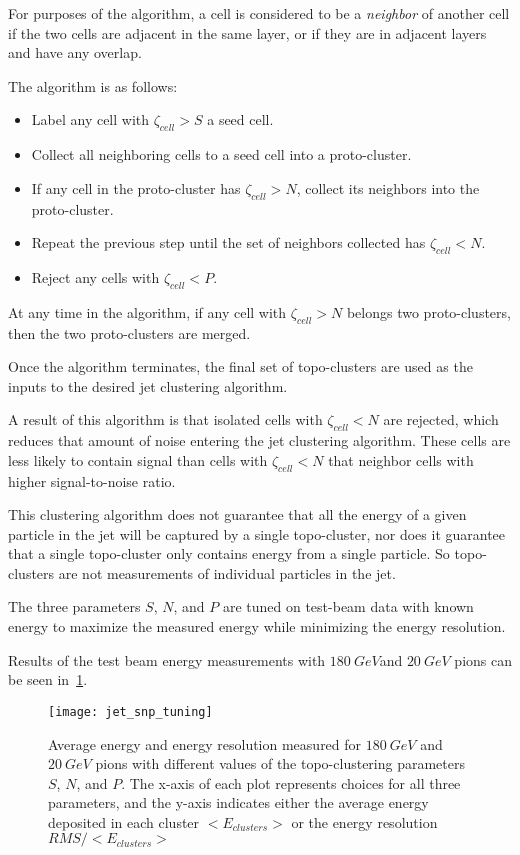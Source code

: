 For purposes of the algorithm, a cell is considered to be a \textit{neighbor} of another cell if the two cells are
adjacent in the same layer, or if they are in adjacent layers and have any overlap.\cite{jet-topo-cluster}

The algorithm is as follows:
\begin{itemize}
    \item Label any cell with $\zeta_{cell}>S$ a seed cell.
    \item Collect all neighboring cells to a seed cell into a proto-cluster.
    \item If any cell in the proto-cluster has $\zeta_{cell}>N$, collect its neighbors into the proto-cluster.
    \item Repeat the previous step until the set of neighbors collected has $\zeta_{cell}<N$.
    \item Reject any cells with $\zeta_{cell}<P$.
\end{itemize}

At any time in the algorithm, if any cell with $\zeta_{cell}>N$ belongs two proto-clusters, then the two
proto-clusters are merged.\cite{jet-topo-cluster}

Once the algorithm terminates, the final set of topo-clusters are used as the inputs to the desired jet clustering
algorithm.

A result of this algorithm is that isolated cells with $\zeta_{cell} < N$ are rejected, which reduces that amount
of noise entering the jet clustering algorithm.
These cells are less likely to contain signal than cells with $\zeta_{cell}<N$ that neighbor cells with higher
signal-to-noise ratio.

This clustering algorithm does not guarantee that all the energy of a given particle in the jet will be captured by a single
topo-cluster, nor does it guarantee that a single topo-cluster only contains energy from a single particle.
So topo-clusters are not measurements of individual particles in the jet.

The three parameters $S$, $N$, and $P$ are tuned on test-beam data with known energy to maximize the measured energy
while minimizing the energy resolution\cite{energy-measurement-of-hadrons}.

Results of the test beam energy measurements with $180~GeV$and $20~GeV$ pions can be seen in~\ref{fig:jet_snp_tuning}.

\begin{figure}[!ht]
    \centering
\texttt{[image: jet\_snp\_tuning]}
\caption{Average energy and energy resolution measured for $180~GeV$ and $20~GeV$ pions with different values of the
topo-clustering parameters $S$, $N$, and $P$.
The x-axis of each plot represents choices for all three parameters, and the y-axis indicates either the average
energy deposited in each cluster $<E_{clusters}>$ or the energy resolution $RMS/<E_{clusters}>$}
\label{fig:jet_snp_tuning}
\end{figure}\cite{energy-measurement-of-hadrons}

